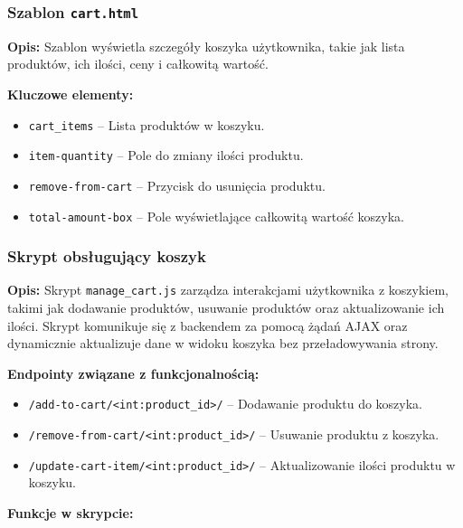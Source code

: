 \documentclass[12pt,a4paper,oneside]{article}
\theoremstyle{definition}
\numberwithin{equation}{section}
\begin{document}
\subsubsection{Szablon \texttt{cart.html}}

\textbf{Opis:}  
Szablon wyświetla szczegóły koszyka użytkownika, takie jak lista produktów, ich ilości, ceny i całkowitą wartość.

\textbf{Kluczowe elementy:}
\begin{itemize}
    \item \texttt{cart\_items} – Lista produktów w koszyku.
    \item \texttt{item-quantity} – Pole do zmiany ilości produktu.
    \item \texttt{remove-from-cart} – Przycisk do usunięcia produktu.
    \item \texttt{total-amount-box} – Pole wyświetlające całkowitą wartość koszyka.
\end{itemize}



\subsubsection{Skrypt obsługujący koszyk}

\textbf{Opis:}  
Skrypt \texttt{manage\_cart.js} zarządza interakcjami użytkownika z koszykiem, takimi jak dodawanie produktów, usuwanie produktów oraz aktualizowanie ich ilości. Skrypt komunikuje się z backendem za pomocą żądań AJAX oraz dynamicznie aktualizuje dane w widoku koszyka bez przeładowywania strony.

\textbf{Endpointy związane z funkcjonalnością:}
\begin{itemize}
    \item \texttt{/add-to-cart/<int:product\_id>/} – Dodawanie produktu do koszyka.
    \item \texttt{/remove-from-cart/<int:product\_id>/} – Usuwanie produktu z koszyka.
    \item \texttt{/update-cart-item/<int:product\_id>/} – Aktualizowanie ilości produktu w koszyku.
\end{itemize}

\textbf{Funkcje w skrypcie:}
\end{document}
